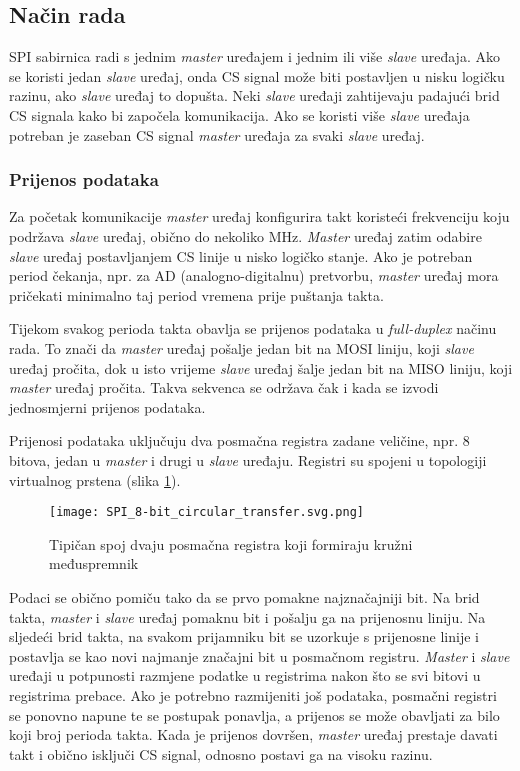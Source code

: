 \subsection{Način rada}

SPI sabirnica radi s jednim \textit{master} uređajem i jednim ili više \textit{slave} uređaja. Ako se koristi jedan \textit{slave} uređaj, onda CS signal može biti postavljen u nisku logičku razinu, ako \textit{slave} uređaj to dopušta. Neki \textit{slave} uređaji zahtijevaju padajući brid CS signala kako bi započela komunikacija. Ako se koristi više \textit{slave} uređaja potreban je zaseban CS signal \textit{master} uređaja za svaki \textit{slave} uređaj.

\subsubsection{Prijenos podataka}

Za početak komunikacije \textit{master} uređaj konfigurira takt koristeći frekvenciju koju podržava \textit{slave} uređaj, obično do nekoliko MHz. \textit{Master} uređaj zatim odabire \textit{slave} uređaj postavljanjem CS linije u nisko logičko stanje. Ako je potreban period čekanja, npr. za AD (analogno-digitalnu) pretvorbu, \textit{master} uređaj mora pričekati minimalno taj period vremena prije puštanja takta.

Tijekom svakog perioda takta obavlja se prijenos podataka u \textit{full-duplex} načinu rada. To znači da \textit{master} uređaj pošalje jedan bit na MOSI liniju, koji \textit{slave} uređaj pročita, dok u isto vrijeme \textit{slave} uređaj šalje jedan bit na MISO liniju, koji \textit{master} uređaj pročita. Takva sekvenca se održava čak i kada se izvodi jednosmjerni prijenos podataka.

Prijenosi podataka uključuju dva posmačna registra zadane veličine, npr. 8 bitova, jedan u \textit{master} i drugi u \textit{slave} uređaju. Registri su spojeni u topologiji virtualnog prstena (slika \ref{fig:spi_circular_transfer}).
\begin{figure}[H]
	\centering
	\texttt{[image: SPI\_8-bit\_circular\_transfer.svg.png]}
	\caption{Tipičan spoj dvaju posmačna registra koji formiraju kružni međuspremnik \cite{spi_wikipedia}}
	\label{fig:spi_circular_transfer}
\end{figure}
Podaci se obično pomiču tako da se prvo pomakne najznačajniji bit. Na brid takta, \textit{master} i \textit{slave} uređaj pomaknu bit i pošalju ga na prijenosnu liniju. Na sljedeći brid takta, na svakom prijamniku bit se uzorkuje s prijenosne linije i postavlja se kao novi najmanje značajni bit u posmačnom registru. \textit{Master} i \textit{slave} uređaji u potpunosti razmjene podatke u registrima nakon što se svi bitovi u registrima prebace. Ako je potrebno razmijeniti još podataka, posmačni registri se ponovno napune te se postupak ponavlja, a prijenos se može obavljati za bilo koji broj perioda takta. Kada je prijenos dovršen, \textit{master} uređaj prestaje davati takt i obično isključi CS signal, odnosno postavi ga na visoku razinu.

